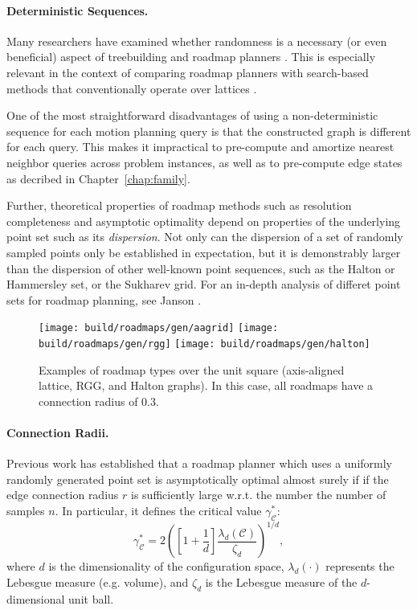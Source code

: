 \paragraph{Deterministic Sequences.}
Many researchers have examined whether randomness is a necessary
(or even beneficial) aspect of treebuilding and roadmap planners
\citep{branicky2002detvsprobroadmaps}.
This is especially relevant in the context of comparing
roadmap planners with search-based methods
that conventionally operate over lattices \citep{lavalle2002gridprms}.

One of the most straightforward disadvantages of using a
non-deterministic sequence for each motion planning query
is that the constructed graph is different for each query.
This makes it impractical to pre-compute and amortize nearest
neighbor queries across problem instances,
as well as to pre-compute edge states as decribed in
Chapter~\ref{chap:family}.

Further,
theoretical properties of roadmap methods
such as resolution completeness and asymptotic optimality
depend on properties of the underlying point set
such as its \emph{dispersion}.
Not only can the dispersion of a set of randomly sampled points
only be established in expectation,
but it is demonstrably larger than the dispersion of other
well-known point sequences,
such as the Halton or Hammersley set,
or the Sukharev grid.
For an in-depth analysis of differet point sets for roadmap
planning, see Janson \citep{janson2015deterministicsampling}.

\begin{figure}
   \centering
   \texttt{[image: build/roadmaps/gen/aagrid]}
   \texttt{[image: build/roadmaps/gen/rgg]}
   \texttt{[image: build/roadmaps/gen/halton]}
   \caption{Examples of roadmap types over the unit square
      (axis-aligned lattice, RGG, and Halton graphs).
      In this case, all roadmaps have a connection radius of 0.3.}
\end{figure}

\paragraph{Connection Radii.}
Previous work \citep{karaman2011samplingoptimal} has established
that a roadmap planner which uses a uniformly randomly generated
point set is asymptotically optimal almost surely
if if the edge connection radius $r$ is sufficiently large w.r.t.
the number the number of samples $n$.
In particular,
it defines the critical value $\gamma^*_{\mathcal{C}}$:
\begin{equation}
   \gamma^*_{\mathcal{C}}
      = 2 \left( \left[ 1 + \frac{1}{d} \right]
         \frac{\lambda_d(\mathcal{C})}{\zeta_d} \right)^{1/d},
\end{equation}
where $d$ is the dimensionality of the configuration space,
$\lambda_d(\cdot)$ represents the Lebesgue measure (e.g. volume),
and $\zeta_d$ is the Lebesgue measure of the $d$-dimensional unit ball.

